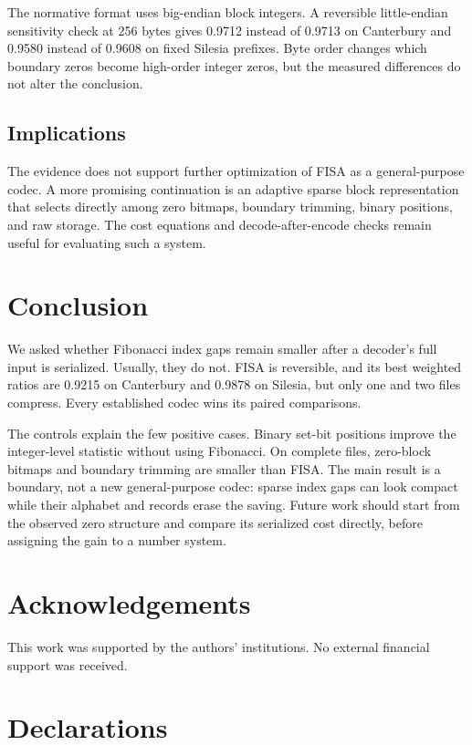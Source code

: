 \documentclass[a4paper,fleqn]{cas-dc}
\begin{document}
The normative format uses big-endian block integers. A reversible
little-endian sensitivity check at 256 bytes gives 0.9712 instead of 0.9713
on Canterbury and 0.9580 instead of 0.9608 on fixed Silesia prefixes. Byte
order changes which boundary zeros become high-order integer zeros, but the
measured differences do not alter the conclusion.

\subsection{Implications}

The evidence does not support further optimization of FISA as a
general-purpose codec. A more promising continuation is an adaptive sparse
block representation that selects directly among zero bitmaps, boundary
trimming, binary positions, and raw storage. The cost equations and
decode-after-encode checks remain useful for evaluating such a system.

\section{Conclusion}
\label{sec:conclusion}

We asked whether Fibonacci index gaps remain smaller after a decoder's full
input is serialized. Usually, they do not. FISA is reversible, and its best
weighted ratios are 0.9215 on Canterbury and 0.9878 on Silesia, but only one
and two files compress. Every established codec wins its paired comparisons.

The controls explain the few positive cases. Binary set-bit positions improve
the integer-level statistic without using Fibonacci. On complete files,
zero-block bitmaps and boundary trimming are smaller than FISA. The main
result is a boundary, not a new general-purpose codec: sparse index gaps can
look compact while their alphabet and records erase the saving. Future work
should start from the observed zero structure and compare its serialized cost
directly, before assigning the gain to a number system.

\section*{Acknowledgements}

This work was supported by the authors' institutions. No external financial
support was received.

\printcredits

\section*{Declarations}
\end{document}
